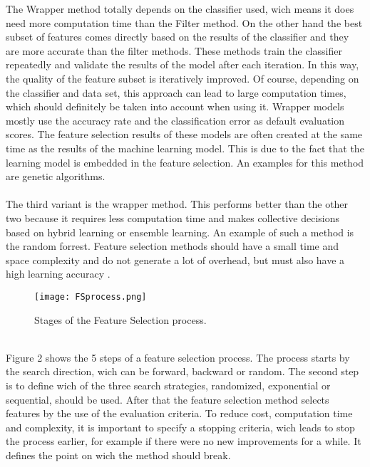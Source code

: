 \documentclass[../masterarbeit.tex]{subfiles}
\begin{document}
The Wrapper method totally depends on the classifier used, wich means it does need more computation time than the Filter method. On the other hand the best subset of features comes directly based on the results of the classifier and they are more accurate than the filter methods. \autocite[]{VenkateshAnuradha:2019} \textcite[]{CAI201870} These methods train the classifier repeatedly and validate the results of the model after each iteration. In this way, the quality of the feature subset is iteratively improved. Of course, depending on the classifier and data set, this approach can lead to large computation times, which should definitely be taken into account when using it. \autocite[]{PISNER2020101}
Wrapper models mostly use the accuracy rate and the classification error as default evaluation scores. The feature selection results of these models are often created at the same time as the results of the machine learning model. This is due to the fact that the learning model is embedded in the feature selection. \autocite[]{CAI201870}
An examples for this method are genetic algorithms. \\~\\
The third variant is the wrapper method. This performs better than the other two because it requires less computation time and makes collective decisions based on hybrid learning or ensemble learning. An example of such a method is the random forrest. \autocite[]{VenkateshAnuradha:2019} \textcite[]{CAI201870}
Feature selection methods should have a small time and space complexity and do not generate a lot of overhead, but must also have a high learning accuracy  \textcite[]{CAI201870}.
\\
\begin{figure}[h]
    \centering
    \texttt{[image: FSprocess.png]}
    \caption{ Stages of the Feature Selection process.} 
\end{figure}
\\
Figure 2 shows the 5 steps of a feature selection process. The process starts by the search direction, wich can be forward, backward or random. The second step is to define wich of the three search strategies, randomized,  exponential  or  sequential, should be used. After that the feature selection method selects features by the use of the evaluation criteria. To reduce cost, computation time and complexity, it is important to specify a stopping criteria, wich leads to stop the process earlier, for example if there were no new improvements for a while. It defines the point on wich the method should break. \autocite[]{VenkateshAnuradha:2019}
\end{document}
